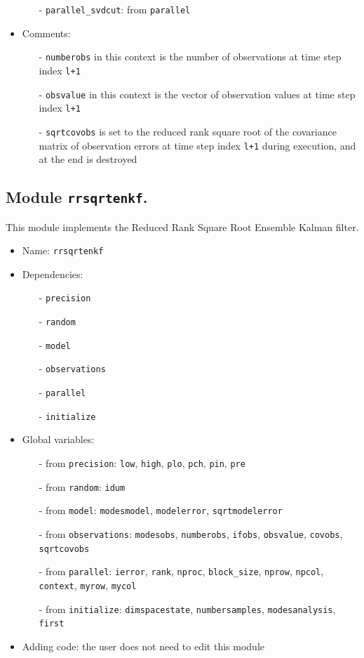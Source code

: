 \documentclass[12pt]{article}
\begin{document}
\begin{itemize}
\begin{itemize}
\item[-] {\tt parallel\_svdcut}: from {\tt parallel}
\end{itemize}
\item Comments: 
\begin{itemize}
\item[-] {\tt numberobs} in this context is the number of observations at time step index {\tt l+1} 
\item[-] {\tt obsvalue} in this context is the vector of observation values at time step index {\tt l+1}
\item[-] {\tt sqrtcovobs} is set to the reduced rank square root of the covariance matrix of observation errors at time step index {\tt l+1} during execution, and at the end is destroyed 
\end{itemize}
\end{itemize} 

\subsection{Module {\tt rrsqrtenkf}.} 
This module implements the Reduced Rank Square Root Ensemble Kalman filter.
\begin{itemize}
\item Name: {\tt rrsqrtenkf}
\item Dependencies: 
\begin{itemize}
\item[-] {\tt precision}
\item[-] {\tt random}
\item[-] {\tt model}
\item[-] {\tt observations}
\item[-] {\tt parallel}
\item[-] {\tt initialize}
\end{itemize}
\item Global variables: 
\begin{itemize}
\item[-] from {\tt precision}: {\tt low}, {\tt high}, {\tt plo}, {\tt pch}, {\tt pin}, {\tt pre} 
\item[-] from {\tt random}: {\tt idum}
\item[-] from {\tt model}: {\tt modesmodel}, {\tt modelerror}, {\tt sqrtmodelerror}
\item[-] from {\tt observations}: {\tt modesobs}, {\tt numberobs}, {\tt ifobs}, {\tt obsvalue}, {\tt covobs}, {\tt sqrtcovobs}
\item[-] from {\tt parallel}: {\tt ierror}, {\tt rank}, {\tt nproc}, {\tt block\_size}, {\tt nprow}, {\tt npcol}, {\tt context}, {\tt myrow}, {\tt mycol}
\item[-] from {\tt initialize}: {\tt dimspacestate}, {\tt numbersamples}, {\tt modesanalysis}, {\tt first}
\end{itemize}
\item Adding code: the user does not need to edit this module
\end{itemize}
\end{document}
